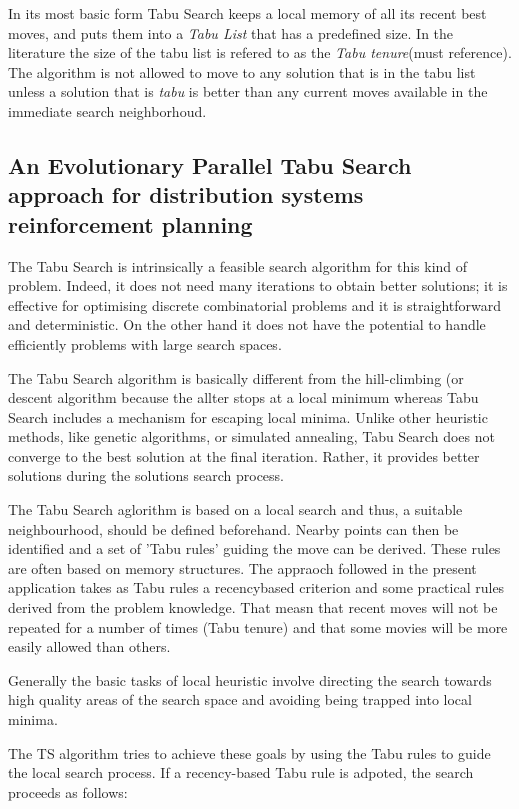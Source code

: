 In its most basic form Tabu Search keeps a local memory of all its recent best moves, and puts them into a \emph{Tabu List} that has a predefined size. In the literature the size of the tabu list is refered to as the \emph{Tabu tenure}(must reference). The algorithm is not allowed to move to any solution that is in the tabu list unless a solution that is \emph{tabu} is better than any current moves available in the immediate search neighborhoud.


\subsection{An Evolutionary Parallel Tabu Search approach for distribution systems reinforcement planning}
The Tabu Search is intrinsically a feasible search algorithm for this kind of problem. Indeed, it does not need many iterations to obtain better solutions; it is effective for optimising discrete combinatorial problems and it is straightforward and deterministic. On the other hand it does not have the potential to handle efficiently problems with large search spaces.

The Tabu Search algorithm is basically different from the hill-climbing (or descent algorithm because the allter stops at a local minimum whereas Tabu Search includes a mechanism for escaping local minima. Unlike other heuristic methods, like genetic algorithms, or simulated annealing, Tabu Search does not converge to the best solution at the final iteration. Rather, it provides better solutions during the solutions search process.

The Tabu Search aglorithm is based on a local search and thus, a suitable neighbourhood, should be defined beforehand. Nearby points can then be identified and a set of 'Tabu rules' guiding the move can be derived. These rules are often based on memory structures. The appraoch followed in the present application takes as Tabu rules a recencybased criterion and some practical rules derived from the problem knowledge. That measn that recent moves will not be repeated for a number of times (Tabu tenure) and that some movies will be more easily allowed than others.

Generally the basic tasks of local heuristic involve directing the search towards high quality areas of the search space and avoiding being trapped into local minima.

The TS algorithm tries to achieve these goals by using the Tabu rules to guide the local search process. If a recency-based Tabu rule is adpoted, the search proceeds as follows:


